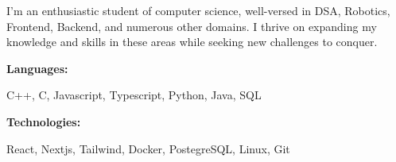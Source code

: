 \documentclass[9pt]{developercv} %
\begin{document}
\begin{minipage}[t]{0.46\textwidth}
    \vspace{-6pt}

    {I'm an enthusiastic student of computer
        science, well-versed in DSA, Robotics,
        Frontend, Backend, and numerous other
        domains. I thrive on expanding my
        knowledge and skills in these areas while
        seeking new challenges to conquer.} \\
\end{minipage}
\hfill %
\begin{minipage}[t]{0.465\textwidth}
    \vspace{-6pt}

    \begin{minipage}[t]{0.2\textwidth}
        \textbf{Languages:}
    \end{minipage}
    \hfill
    \begin{minipage}[t]{0.73\textwidth}
        C++, C, Javascript, Typescript, Python, Java, SQL
    \end{minipage}
    \vspace{4mm}

    \begin{minipage}[t]{0.2\textwidth}
        \textbf{Technologies:}
    \end{minipage}
    \hfill
    \begin{minipage}[t]{0.73\textwidth}
        React, Nextjs, Tailwind, Docker, PostegreSQL, Linux, Git
    \end{minipage}

\end{minipage}
\end{document}
